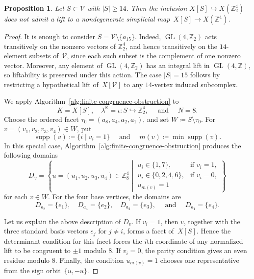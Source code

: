 \documentclass{amsart}
\newcommand{\Z}{\mathbb{Z}}
\newcommand{\R}{\mathbb{R}}
\newcommand{\cV}{\mathcal{V}}
\DeclareMathOperator{\GL}{GL}
\DeclareMathOperator{\supp}{supp}
\newtheorem{proposition}[theorem]{Proposition}
\theoremstyle{definition}
\theoremstyle{remark}
\begin{document}
\begin{proposition}\label{prop:14-subset-nonliftable}
    Let $S\subset \cV$ with $|S|\geq14$. 
    Then the inclusion $X[S]\hookrightarrow X(\Z_2^4)$ does not admit a lift to a nondegenerate simplicial map~$X[S]\to X(\Z^4)$.
\end{proposition}
\begin{proof}
    It is enough to consider $S=\cV\setminus\{a_{15}\}$.
    Indeed, $\GL(4,\Z_2)$ acts transitively on the nonzero vectors of $\Z_2^4$, and hence transitively on the $14$-element subsets of~$\cV$, since each such subset is the complement of one nonzero vector. 
    Moreover, any element of $\GL(4,\Z_2)$ has an integral lift in $\GL(4,\Z)$, so liftability is preserved under this action.
    The case $|S|=15$ follows by restricting a hypothetical lift of~$X[\cV]$ to any $14$-vertex induced subcomplex.
    
    We apply Algorithm~\ref{alg:finite-congruence-obstruction} to
    $$
        K=X[S],\quad \lambda^\R=\iota \colon S\hookrightarrow\Z_2^4, \quad \text{ and } \quad N=8.
    $$
    Choose the ordered facet $\tau_0=(a_8, a_4, a_2, a_1)$, and set $W\coloneq S\setminus \tau_0$.
    For $v=(v_1,v_2,v_3,v_4)\in W$, put
    $$
        \supp(v)\coloneq\{i\mid v_i=1\} \quad \text{ and } \quad m(v)\coloneq\min\supp(v).
    $$
    In this special case, Algorithm~\ref{alg:finite-congruence-obstruction} produces
    the following domains
    $$
        D_v= \left\{ u=(u_1,u_2,u_3,u_4)\in \Z_8^4 \middle|
            \begin{array}{ll}
                u_i\in\{1,7\}, & \text{if }v_i=1,\\
                u_i\in\{0,2,4,6\}, & \text{if }v_i=0,\\
                u_{m(v)}=1
            \end{array}
        \right\}
    $$
    for each $v\in W$.
    For the four base vertices, the domains are
    $$
        D_{a_8}=\{e_1\},\quad D_{a_4}=\{e_2\},\quad D_{a_2}=\{e_3\},\quad \text{ and } \quad D_{a_1}=\{e_4\}.
    $$
    
    Let us explain the above description of $D_v$. 
    If $v_i=1$, then $v$, together with the three standard basis vectors $e_j$ for $j\neq i$, forms a facet of~$X[S]$. 
    Hence the determinant condition for this facet forces the $i$th coordinate of any normalized lift to be congruent to $\pm1$ modulo $8$. 
    If $v_i=0$, the parity condition gives an even residue modulo $8$. 
    Finally, the condition $u_{m(v)}=1$ chooses one representative from the sign orbit~$\{u,-u\}$.
    

\end{proof}
\end{document}
